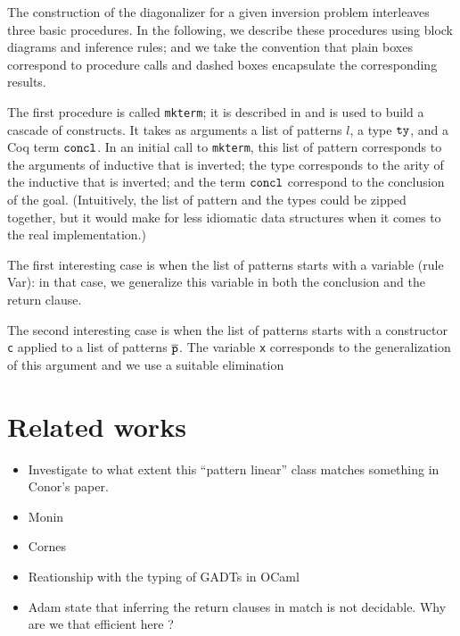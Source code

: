 \documentclass{llncs}
\begin{document}
The construction of the diagonalizer for a given inversion problem
interleaves three basic procedures. In the following, we describe
these procedures using block diagrams and inference rules; and we take
the convention that plain boxes correspond to procedure calls and
dashed boxes encapsulate the corresponding results.

The first procedure is called {\tt mkterm}; it is described in
 and is used to build a cascade of 
constructs. 
%
It takes as arguments a list of patterns $l$, a type $\tt ty$, and a Coq term $\tt concl$.
%
In an initial call to {\tt mkterm}, this list of pattern corresponds
to the arguments of inductive that is inverted; the type corresponds
to the arity of the inductive that is inverted; and the term $\tt
concl$ correspond to the conclusion of the goal. (Intuitively, the
list of pattern and the types could be zipped together, but it would
make for less idiomatic data structures when it comes to the real
implementation.)

The first interesting case is when the list of patterns starts with a
variable (rule {\sc Var}): in that case, we generalize this variable
in both the conclusion and the return clause.

The second interesting case is when the list of patterns starts with a
constructor {\tt c} applied to a list of patterns ${\tt \overline{p}}$.
%
The variable {\tt x} corresponds to the generalization of this
argument and we use a suitable elimination

\section{Related works}
\begin{itemize}
\item Investigate to what extent this ``pattern linear'' class matches
  something in Conor's paper.
\item Monin
\item Cornes
\item Reationship with the typing of GADTs in OCaml
\item Adam state that inferring the return clauses in match is not
  decidable. Why are we that efficient here ?
\end{itemize}
\end{document}
